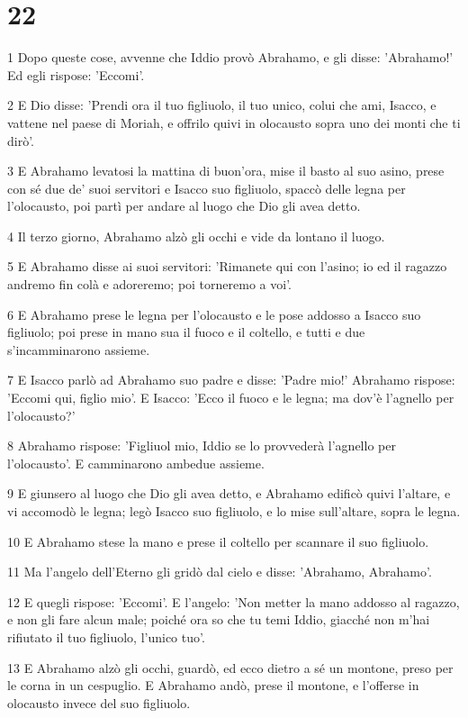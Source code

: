 \chapter{22}

\par 1 Dopo queste cose, avvenne che Iddio provò Abrahamo, e gli disse: 'Abrahamo!' Ed egli rispose: 'Eccomi'.
\par 2 E Dio disse: 'Prendi ora il tuo figliuolo, il tuo unico, colui che ami, Isacco, e vattene nel paese di Moriah, e offrilo quivi in olocausto sopra uno dei monti che ti dirò'.
\par 3 E Abrahamo levatosi la mattina di buon'ora, mise il basto al suo asino, prese con sé due de' suoi servitori e Isacco suo figliuolo, spaccò delle legna per l'olocausto, poi partì per andare al luogo che Dio gli avea detto.
\par 4 Il terzo giorno, Abrahamo alzò gli occhi e vide da lontano il luogo.
\par 5 E Abrahamo disse ai suoi servitori: 'Rimanete qui con l'asino; io ed il ragazzo andremo fin colà e adoreremo; poi torneremo a voi'.
\par 6 E Abrahamo prese le legna per l'olocausto e le pose addosso a Isacco suo figliuolo; poi prese in mano sua il fuoco e il coltello, e tutti e due s'incamminarono assieme.
\par 7 E Isacco parlò ad Abrahamo suo padre e disse: 'Padre mio!' Abrahamo rispose: 'Eccomi qui, figlio mio'. E Isacco: 'Ecco il fuoco e le legna; ma dov'è l'agnello per l'olocausto?'
\par 8 Abrahamo rispose: 'Figliuol mio, Iddio se lo provvederà l'agnello per l'olocausto'. E camminarono ambedue assieme.
\par 9 E giunsero al luogo che Dio gli avea detto, e Abrahamo edificò quivi l'altare, e vi accomodò le legna; legò Isacco suo figliuolo, e lo mise sull'altare, sopra le legna.
\par 10 E Abrahamo stese la mano e prese il coltello per scannare il suo figliuolo.
\par 11 Ma l'angelo dell'Eterno gli gridò dal cielo e disse: 'Abrahamo, Abrahamo'.
\par 12 E quegli rispose: 'Eccomi'. E l'angelo: 'Non metter la mano addosso al ragazzo, e non gli fare alcun male; poiché ora so che tu temi Iddio, giacché non m'hai rifiutato il tuo figliuolo, l'unico tuo'.
\par 13 E Abrahamo alzò gli occhi, guardò, ed ecco dietro a sé un montone, preso per le corna in un cespuglio. E Abrahamo andò, prese il montone, e l'offerse in olocausto invece del suo figliuolo.
